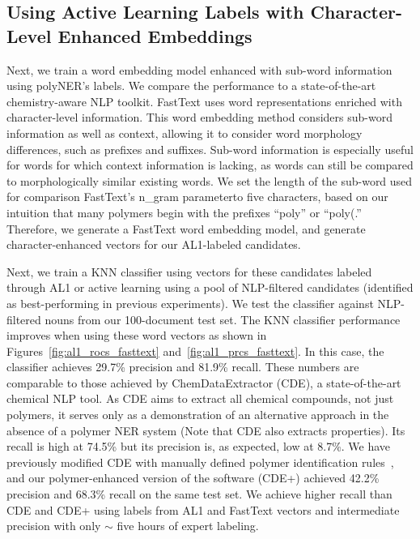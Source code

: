 \subsection{Using Active Learning Labels with Character-Level Enhanced Embeddings}
Next, we train a word embedding model enhanced with sub-word information using polyNER's labels. 
We compare the performance to a state-of-the-art chemistry-aware NLP toolkit. %
FastText uses word representations enriched with character-level information.
This word embedding method considers sub-word information as well as
context, allowing it to consider word morphology differences, such as prefixes
and suffixes. Sub-word information is especially useful for words for which
context information is lacking, as words can still be compared to morphologically similar
existing words. We set the length of the sub-word used for comparison\textemdash
FastText's n_gram parameter\textemdash to five characters, based on our intuition that
many polymers begin with the prefixes ``poly'' or ``poly(.'' 
Therefore, we generate a FastText word embedding model, and generate character-enhanced vectors for our AL1-labeled candidates.


Next, we train a KNN classifier using vectors for these candidates labeled through AL1 or active learning using a pool of NLP-filtered candidates (identified as best-performing in previous experiments).
We test the classifier against NLP-filtered nouns from our 100-document test set.
The KNN classifier performance improves when using these word vectors as shown in Figures~\ref{fig:al1_rocs_fasttext} and~\ref{fig:al1_prcs_fasttext}.
In this case, the classifier achieves 29.7\% precision and 81.9\% recall. 
These numbers are comparable to those achieved by ChemDataExtractor (CDE), a state-of-the-art chemical NLP tool.
As CDE aims to extract all
chemical compounds, not just polymers, it serves only as a demonstration of an
alternative approach in the absence of a polymer NER system (Note that CDE also extracts properties). 
Its recall is high
at 74.5\% but its precision is, as expected, low at 8.7\%. 
We have previously modified CDE with
manually defined polymer identification rules~\cite{tchoua2017towards},
and our polymer-enhanced version of the software (CDE+) achieved 42.2\% precision and 68.3\% recall on the same test set. 
We achieve higher recall than CDE and CDE+ using labels from AL1 and FastText vectors and intermediate precision with only $\sim$ five hours of expert labeling.

